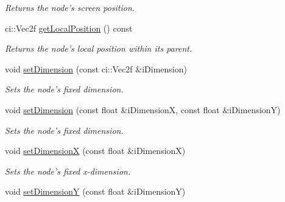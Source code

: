 \begin{DoxyCompactItemize}
\begin{DoxyCompactList}\small\item\em Returns the node's screen position. \end{DoxyCompactList}\item 
\hypertarget{class_ui_base_a8a65bb2e11001082883cdf36a36013f0}{ci\-::\-Vec2f \hyperlink{class_ui_base_a8a65bb2e11001082883cdf36a36013f0}{get\-Local\-Position} () const }\label{class_ui_base_a8a65bb2e11001082883cdf36a36013f0}

\begin{DoxyCompactList}\small\item\em Returns the node's local position within its parent. \end{DoxyCompactList}\item 
\hypertarget{class_ui_base_a9282497df8eca1933674b4bb8eeacbc5}{void \hyperlink{class_ui_base_a9282497df8eca1933674b4bb8eeacbc5}{set\-Dimension} (const ci\-::\-Vec2f \&i\-Dimension)}\label{class_ui_base_a9282497df8eca1933674b4bb8eeacbc5}

\begin{DoxyCompactList}\small\item\em Sets the node's fixed dimension. \end{DoxyCompactList}\item 
\hypertarget{class_ui_base_a7bdda6f15ffe5f17eaf5a1346d5001b2}{void \hyperlink{class_ui_base_a7bdda6f15ffe5f17eaf5a1346d5001b2}{set\-Dimension} (const float \&i\-Dimension\-X, const float \&i\-Dimension\-Y)}\label{class_ui_base_a7bdda6f15ffe5f17eaf5a1346d5001b2}

\begin{DoxyCompactList}\small\item\em Sets the node's fixed dimension. \end{DoxyCompactList}\item 
\hypertarget{class_ui_base_ae01d8a42ee5e97b469c57ef6b129e4d9}{void \hyperlink{class_ui_base_ae01d8a42ee5e97b469c57ef6b129e4d9}{set\-Dimension\-X} (const float \&i\-Dimension\-X)}\label{class_ui_base_ae01d8a42ee5e97b469c57ef6b129e4d9}

\begin{DoxyCompactList}\small\item\em Sets the node's fixed x-\/dimension. \end{DoxyCompactList}\item 
\hypertarget{class_ui_base_a08796f637b3d044ab7b08f7c92cb1a84}{void \hyperlink{class_ui_base_a08796f637b3d044ab7b08f7c92cb1a84}{set\-Dimension\-Y} (const float \&i\-Dimension\-Y)}\label{class_ui_base_a08796f637b3d044ab7b08f7c92cb1a84}


\end{DoxyCompactItemize}

